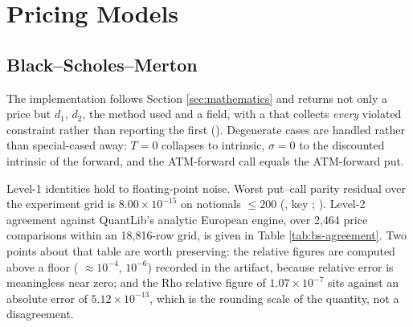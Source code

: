 \documentclass[11pt,a4paper]{article}
\begin{document}
\section{Pricing Models}
\label{sec:pricing}

\subsection{Black--Scholes--Merton}
The implementation follows Section \ref{sec:mathematics} and returns not only a price but
$d_1$, $d_2$, the method used and a  field, with a  that collects
\emph{every} violated constraint rather than reporting the first
(). Degenerate cases are handled
rather than special-cased away: $T = 0$ collapses to intrinsic, $\sigma = 0$ to the discounted
intrinsic of the forward, and the ATM-forward call equals the ATM-forward put.

Level-1 identities hold to floating-point noise. Worst put--call parity residual over the
experiment grid is $8.00 \times 10^{-15}$ on notionals $\le 200$
(, key
; ). Level-2 agreement against
QuantLib's analytic European engine, over 2{,}464 price comparisons within an 18{,}816-row
grid, is given in Table \ref{tab:bs-agreement}. Two points about that table are worth
preserving: the relative figures are computed above a floor (
$\approx 10^{-4}$,  $10^{-6}$) recorded in the artifact, because relative
error is meaningless near zero; and the Rho relative figure of $1.07\times 10^{-7}$ sits
against an absolute error of $5.12\times 10^{-13}$, which is the rounding scale of the
quantity, not a disagreement.
\end{document}
